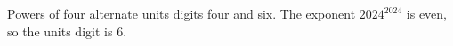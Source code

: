 Powers of four alternate units digits four and six. The exponent $2024^{2024}$ is even, so the units digit is $\boxed6$.
